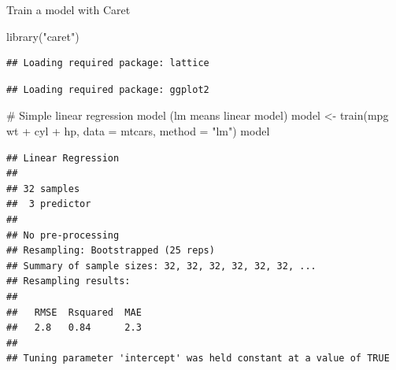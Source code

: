\documentclass[9pt,ignorenonframetext,]{beamer}
\newenvironment{Shaded}{\begin{snugshade}}{\end{snugshade}}
\newcommand{\CommentTok}[1]{\textcolor[rgb]{0.50,0.62,0.50}{#1}}
\newcommand{\DataTypeTok}[1]{\textcolor[rgb]{0.87,0.87,0.75}{#1}}
\newcommand{\KeywordTok}[1]{\textcolor[rgb]{0.94,0.87,0.69}{#1}}
\newcommand{\NormalTok}[1]{\textcolor[rgb]{0.80,0.80,0.80}{#1}}
\newcommand{\OperatorTok}[1]{\textcolor[rgb]{0.94,0.94,0.82}{#1}}
\newcommand{\StringTok}[1]{\textcolor[rgb]{0.80,0.58,0.58}{#1}}
\begin{document}
\begin{frame}[fragile]{Train a model with Caret}
\protect\hypertarget{train-a-model-with-caret}{}

\small

\begin{Shaded}
\begin{Highlighting}[]
\KeywordTok{library}\NormalTok{(}\StringTok{"caret"}\NormalTok{)}
\end{Highlighting}
\end{Shaded}

\begin{verbatim}
## Loading required package: lattice
\end{verbatim}

\begin{verbatim}
## Loading required package: ggplot2
\end{verbatim}

\begin{Shaded}
\begin{Highlighting}[]
\CommentTok{# Simple linear regression model (lm means linear model)}
\NormalTok{model <-}\StringTok{ }\KeywordTok{train}\NormalTok{(mpg }\OperatorTok{~}\StringTok{ }\NormalTok{wt }\OperatorTok{+}\StringTok{ }\NormalTok{cyl }\OperatorTok{+}\StringTok{ }\NormalTok{hp,}
               \DataTypeTok{data =}\NormalTok{ mtcars,}
               \DataTypeTok{method =} \StringTok{"lm"}\NormalTok{)}
\NormalTok{model}
\end{Highlighting}
\end{Shaded}

\begin{verbatim}
## Linear Regression 
## 
## 32 samples
##  3 predictor
## 
## No pre-processing
## Resampling: Bootstrapped (25 reps) 
## Summary of sample sizes: 32, 32, 32, 32, 32, 32, ... 
## Resampling results:
## 
##   RMSE  Rsquared  MAE
##   2.8   0.84      2.3
## 
## Tuning parameter 'intercept' was held constant at a value of TRUE
\end{verbatim}

\end{frame}
\end{document}
